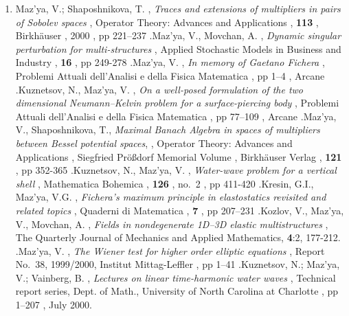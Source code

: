\documentclass{article}
\newcommand{\authors}[1]{\item #1\ignorespaces}
\renewcommand{\title}[1]{, \textit{#1}\ignorespaces}
\newcommand{\journal}[1]{, {#1}\ignorespaces}
\newcommand{\book}[1]{, {#1}\ignorespaces}
\newcommand{\series}[1]{, {#1}\ignorespaces}
\newcommand{\publisher}[1]{, {#1}\ignorespaces}
\newcommand{\conference}[1]{, {#1}\ignorespaces}
\newcommand{\volume}[1]{, \textbf{#1}\ignorespaces}
\newcommand{\no}[1]{, no.~{#1}\ignorespaces}
\newcommand{\Year}[1]{, #1\ignorespaces}
\newcommand{\pages}[1]{, pp #1\ignorespaces}
\newcommand{\jitem}[1]{.}
\begin{document}
\begin{enumerate}
\authors{Maz'ya, V.; Shaposhnikova, T.}
\title{Traces and extensions of
multipliers in pairs of Sobolev spaces}
\journal{Operator Theory: Advances and Applications}
\volume{113}
\publisher{Birkh\"auser}
\Year{2000}
\pages{221--237}
\jitem

\authors{Maz'ya, V., Movchan, A.}
\title{Dynamic singular perturbation for multi-structures}
\journal{Applied Stochastic Models in Business and Industry}
\volume{16}
\pages{249-278}
\jitem


\authors{Maz'ya, V.}
\title{In memory of Gaetano Fichera}
\book{Problemi Attuali dell'Analisi e della Fisica Matematica}
\pages{1--4}
\publisher{Arcane}
\jitem

\authors{Kuznetsov, N., Maz'ya, V.}
\title{On a well-posed formulation of the two dimensional
Neumann--Kelvin
problem for a surface-piercing body}
\book{Problemi Attuali dell'Analisi e della Fisica Matematica}
\pages{77--109}
\publisher{Arcane}
\jitem






\item  Maz'ya, V., Shaposhnikova, T., {\it Maximal Banach Algebra in
spaces
     of multipliers between Bessel potential spaces},
     \series{Operator Theory: Advances and Applications}
     \conference{Siegfried Pr\"o{\ss}dorf Memorial Volume}
     \publisher{Birkh\"auser Verlag}
\volume{121}
\pages{352-365}
\jitem


\authors{Kuznetsov, N., Maz'ya, V.}
\title{Water-wave problem for a vertical shell}
\journal{Mathematica Bohemica} 
\volume{126}
\no{2}
\pages{411-420}
\jitem




\authors{Kresin, G.I., Maz'ya, V.G.}
\title{Fichera's maximum principle in elastostatics revisited and
related
topics}
\journal{Quaderni di Matematica}
\volume{7}
\pages{207--231}
\jitem

\authors{Kozlov, V., Maz'ya, V., Movchan, A.}
\title{Fields in nondegenerate 1D--3D elastic multistructures}
\journal{The Quarterly Journal of Mechanics and Applied Mathematics},
{\bf
4}:2, 177-212.
\jitem

\authors{Maz'ya, V.}
\title{The Wiener test for higher order elliptic equations}
\journal{Report No.~38, 1999/2000, Institut  Mittag-Leffler}
\pages{1--41}
\jitem

\authors{Kuznetsov, N.; Maz'ya, V.; Vainberg, B.}
\title{Lectures on linear time-harmonic water waves}
\journal{Technical report series, Dept. of Math., University of North
Carolina at Charlotte}
\pages{1--207}
\Year{July 2000.}


\end{enumerate}
\end{document}
